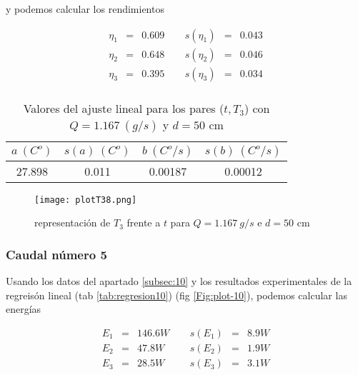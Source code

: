 \documentclass[12pt,a4paper]{article}
\begin{document}
 y podemos calcular los rendimientos 
 
\begin{equation} 
\begin{array}{lllllll}
\eta_1 & = & 0.609  &  \ \ &  s(\eta_1) & =  & 0.043   \\ 
 \eta_2 & = & 0.648  &  \ \ &  s(\eta_2) & =  & 0.046   \\ 
 \eta_3 & = & 0.395  &  \ \ &  s(\eta_3) & =  & 0.034   \\ 
 \end{array} 
\end{equation} 
 
 \begin{table}[h!] 	 \centering 
\begin{tabular}{|c|c|c|c|} 
\hline 
$a \ (C^o)$ & $s(a) \ (C^o)$ & $ b \ (C^o/s)$ & $s(b) \ (C^o/s)$  \\ \hline 
27.898  & 0.011 &  0.00187 & 0.00012 \\ 
\hline
\end{tabular} 
\caption{Valores del ajuste lineal para los pares ($t,T_3$) con $Q=1.167 \ (g/s)$ y $d= 50 $ cm} 
\label{tab:regresion9} 
\end{table} 
 
 
\begin{figure}[h!] 	 \centering 
\texttt{[image: plotT38.png]} 
\caption{representación de $T_3$ frente a $t$ para $Q = 1.167 \ g/s$ e $d = 50$ cm} 
\label{Fig:plot-9}  
\end{figure} 
 
\newpage 
 
 
 
 
\subsubsection{Caudal número 5} 
 
Usando los datos del apartado \ref{subsec:10} y los  resultados experimentales de la regreisón lineal (tab \ref{tab:regresion10}) (fig \ref{Fig:plot-10}), podemos calcular las energías 
 
 \begin{equation} 
\begin{array}{lllllll}
E_1 & = & 146.6 W &  \ \ &  s(E_1) & =  & 8.9  W \\ 
 E_2 & = & 47.8 W &  \ \ &  s(E_2) & =  & 1.9  W \\ 
 E_3 & = & 28.5 W &  \ \ &  s(E_3) & =  & 3.1  W \\ 
 \end{array} 
\end{equation} 
 
\end{document}
